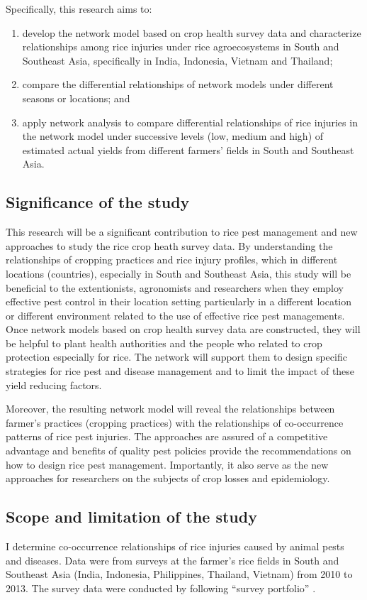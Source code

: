 Specifically, this research aims to:
\begin{enumerate}
\item develop the network model based on crop health survey data and characterize relationships among rice injuries under rice agroecosystems in South and Southeast Asia, specifically in India, Indonesia, Vietnam and Thailand;
\item compare the differential relationships of network models under different seasons or locations; and
\item apply network analysis to compare differential relationships of rice injuries in the network model under successive levels (low, medium and high) of estimated actual yields from different farmers' fields in South and Southeast Asia.
\end{enumerate}

\subsection{Significance of the study}

This research will be a significant contribution to rice pest management and new approaches to study the rice crop heath survey data. By understanding the relationships of cropping practices and rice injury profiles, which in different locations (countries), especially in South and Southeast Asia, this study will be beneficial to the extentionists, agronomists and researchers when they employ effective pest control in their location setting particularly in a different location or different environment related to the use of effective rice pest managements. Once network models based on crop health survey data are constructed, they will be helpful to plant health authorities and the people who related to crop protection especially for rice. The network will support them to design specific strategies for rice pest and disease management and to limit the impact of these yield reducing factors.

Moreover, the resulting network model will reveal the relationships between farmer's practices (cropping practices) with the relationships of co-occurrence patterns of rice pest injuries. The approaches are assured of a competitive advantage and benefits of quality pest policies provide the recommendations on how to design rice pest management. Importantly, it also serve as the new approaches for researchers on the subjects of crop losses  and epidemiology.

\subsection{Scope and limitation of the study}

I determine co-occurrence relationships of rice injuries caused by animal pests and diseases. Data were from  surveys at the farmer's rice fields in South and Southeast Asia (India, Indonesia, Philippines, Thailand, Vietnam) from 2010 to 2013. The survey data were conducted by following ``survey portfolio'' \citep{Savary_2009_Survey}.
